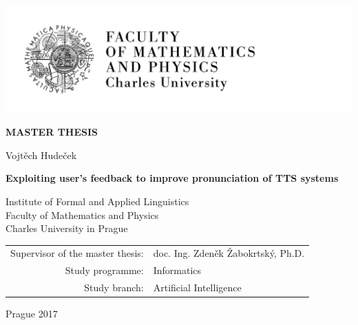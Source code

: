 

\pagestyle{empty}
\hypersetup{pageanchor=false}
\begin{center}

\centerline{\mbox{\includegraphics[width=166mm]{../img/logo-en.pdf}}}

\vspace{-8mm}
\vfill

{\bf\Large MASTER THESIS}

\vfill

{\LARGE Vojt\v{e}ch Hude\v{c}ek}

\vspace{15mm}

{\LARGE\bfseries{Exploiting user's feedback to improve pronunciation of TTS systems}}

\vfill

Institute of Formal and Applied Linguistics \\
Faculty of Mathematics and Physics \\
Charles University in Prague \\

\vfill

\begin{tabular}{rl}

Supervisor of the master thesis: & doc. Ing. Zden\v{e}k \v{Z}abokrtsk\'{y}, Ph.D. \\
\noalign{\vspace{2mm}}
Study programme: & Informatics \\
\noalign{\vspace{2mm}}
Study branch: & Artificial Intelligence \\
\end{tabular}

\vfill

Prague 2017

\end{center}

\newpage

